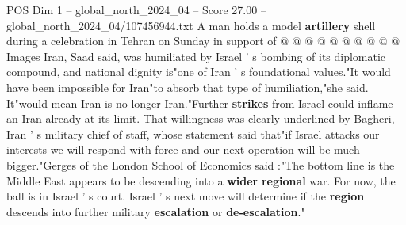 \begin{textsample}{POS Dim 1 – global\_north\_2024\_04 – Score 27.00 – global\_north\_2024\_04/107456944.txt}
A man holds a model \textbf{artillery} shell during a celebration in Tehran on Sunday in support of @ @ @ @ @ @ @ @ @ @ Images Iran, Saad said, was humiliated by Israel ' s bombing of its diplomatic compound, and national dignity is"one of Iran ' s foundational values."It would have been impossible for Iran"to absorb that type of humiliation,"she said.
It"would mean Iran is no longer Iran."Further \textbf{strikes} from Israel could inflame an Iran already at its limit.
That willingness was clearly underlined by Bagheri, Iran ' s military chief of staff, whose statement said that"if Israel attacks our interests we will respond with force and our next operation will be much bigger."Gerges of the London School of Economics said :"The bottom line is the Middle East appears to be descending into a \textbf{wider} \textbf{regional} war.
For now, the ball is in Israel ' s court.
Israel ' s next move will determine if the \textbf{region} descends into further military \textbf{escalation} or \textbf{de-escalation}."

\end{textsample}

